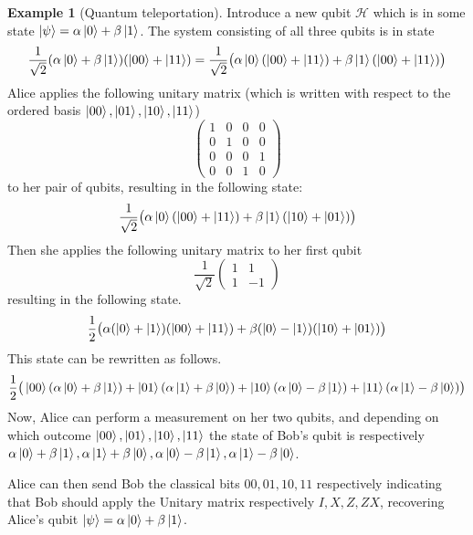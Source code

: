\documentclass[12pt]{article}
\theoremstyle{plain}
\theoremstyle{definition}
\newtheorem{example}[thm]{Example}
\newcommand{\call}[1]{\mathcal{#1}}
\begin{document}
\begin{example}[Quantum teleportation]
		Introduce a new qubit $\call{H}$ which is in some state $\ket{\psi} = \alpha \ket{0} + \beta\ket{1}$. The system consisting of all three qubits is in state
		\begin{equation}
			\frac{1}{\sqrt{2}}(\alpha \ket{0} + \beta\ket{1})(\ket{00} + \ket{11}) = \frac{1}{\sqrt{2}}\big(\alpha\ket{0}(\ket{00} + \ket{11}) + \beta\ket{1}(\ket{00} + \ket{11})\big)
		\end{equation}
		Alice applies the following unitary matrix (which is written with respect to the ordered basis $\ket{00}, \ket{01}, \ket{10}, \ket{11}$)
		\begin{equation}
			\begin{pmatrix}
				1 & 0 & 0 & 0\\
				0 & 1 & 0 & 0\\
				0 & 0 & 0 & 1\\
				0 & 0 & 1 & 0
			\end{pmatrix}
		\end{equation}
		to her pair of qubits, resulting in the following state:
		\begin{equation}
			\frac{1}{\sqrt{2}}\big(\alpha\ket{0}(\ket{00} + \ket{11}) + \beta\ket{1}(\ket{10} + \ket{01})\big)
		\end{equation}
		Then she applies the following unitary matrix to her first qubit
		\begin{equation}
			\frac{1}{\sqrt{2}}
			\begin{pmatrix}
				1 & 1\\
				1 & -1
			\end{pmatrix}
		\end{equation}
		resulting in the following state.
		\begin{equation}
			\frac{1}{2}\big(\alpha(\ket{0} + \ket{1})(\ket{00} + \ket{11}) + \beta(\ket{0} - \ket{1})(\ket{10} + \ket{01})\big)
		\end{equation}
		This state can be rewritten as follows.
		\begin{equation}
			\frac{1}{2}\big(\ket{00}(\alpha \ket{0} + \beta\ket{1}) + \ket{01}(\alpha\ket{1} + \beta\ket{0}) + \ket{10}(\alpha\ket{0} - \beta\ket{1}) + \ket{11}(\alpha\ket{1} - \beta\ket{0})\big)
		\end{equation}
		Now, Alice can perform a measurement on her two qubits, and depending on which outcome $\ket{00}, \ket{01}, \ket{10}, \ket{11}$ the state of Bob's qubit is respectively $\alpha\ket{0} + \beta\ket{1}, \alpha\ket{1} + \beta\ket{0}, \alpha\ket{0} - \beta\ket{1}, \alpha\ket{1} - \beta\ket{0}$.
		
		Alice can then send Bob the classical bits $00, 01, 10, 11$ respectively indicating that Bob should apply the Unitary matrix respectively $I, X, Z, ZX$, recovering Alice's qubit $\ket{\psi} = \alpha\ket{0} + \beta\ket{1}$.
	\end{example}
	
\end{document}
